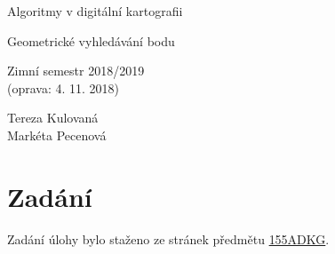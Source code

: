 \documentclass[a4paper, 12pt]{article}
\begin{document}
\begin{titlepage}
\begin{center}
\Huge
\vspace*{4.5cm}
Algoritmy v digitální kartografii \\
\vspace{0.2cm}

\Large  
Geometrické vyhledávání bodu\\
\vspace{0.2cm}

\normalsize  
Zimní semestr 2018/2019\\
(oprava: 4. 11. 2018)
\vspace{14cm}
\end{center}

\begin{flushright}
\Large
Tereza Kulovaná \\
Markéta Pecenová \\
\end{flushright}

\end{titlepage}


\pagestyle{plain}     %
\setcounter{page}{1}  %

\tableofcontents
\newpage

\section{Zadání}
Zadání úlohy bylo staženo ze stránek předmětu \href{https://web.natur.cuni.cz/~bayertom/index.php/teaching/algoritmy-v-digitalni-kartografii}{155ADKG}.
\end{document}
